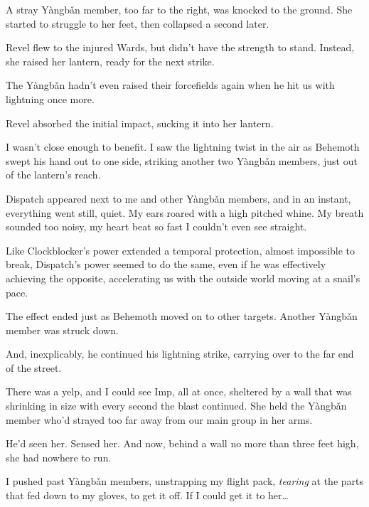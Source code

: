 A stray Y\`{a}ngb\v{a}n member, too far to the right, was knocked to the ground.  She started to struggle to her feet, then collapsed a second later.



Revel flew to the injured Wards, but didn't have the strength to stand.  Instead, she raised her lantern, ready for the next strike.



The Y\`{a}ngb\v{a}n hadn't even raised their forcefields again when he hit us with lightning once more.



Revel absorbed the initial impact, sucking it into her lantern.



I wasn't close enough to benefit.  I saw the lightning twist in the air as Behemoth swept his hand out to one side, striking another two Y\`{a}ngb\v{a}n members, just out of the lantern's reach.



Dispatch appeared next to me and other Y\`{a}ngb\v{a}n members, and in an instant, everything went still, quiet.  My ears roared with a high pitched whine.  My breath sounded too noisy, my heart beat so fast I couldn't even see straight.



Like Clockblocker's power extended a temporal protection, almost impossible to break, Dispatch's power seemed to do the same, even if he was effectively achieving the opposite, accelerating us with the outside world moving at a snail's pace.



The effect ended just as Behemoth moved on to other targets.  Another Y\`{a}ngb\v{a}n member was struck down.



And, inexplicably, he continued his lightning strike, carrying over to the far end of the street.



There was a yelp, and I could see Imp, all at once, sheltered by a wall that was shrinking in size with every second the blast continued.  She held the Y\`{a}ngb\v{a}n member who'd strayed too far away from our main group in her arms.



He'd seen her.  Sensed her.  And now, behind a wall no more than three feet high, she had nowhere to run.



I pushed past Y\`{a}ngb\v{a}n members, unstrapping my flight pack, \emph{tearing} at the parts that fed down to my gloves, to get it off.  If I could get it to her\ldots



